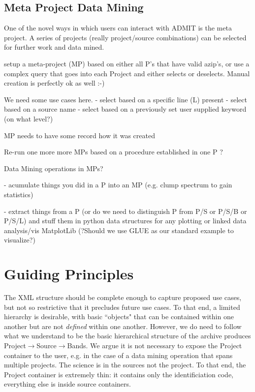 \documentclass{report}
\begin{document}
\subsection{Meta Project Data Mining}

One of the novel ways in which users can interact with ADMIT is the meta project.
A series of projects (really project/source combinations)
can be selected for further work and data mined.



setup a meta-project (MP) based on either all P's that have valid azip's, or use 
a complex query that goes into each Project and either selects or deselects.
Manual creation is perfectly ok as well :-)

We need some use cases here. 
    - select based on a specific line (L) present
    - select based on a source name
    - select based on a previously set user supplied keyword (on what level?)

MP needs to have some record how it was created
  
Re-run one more more MPs based on a procedure established in one P ?

Data Mining operations in MPs?

- acumulate things you did in a P into an MP (e.g. clump spectrum to gain statistics)

- extract things from a P (or do we need to distinguish P from P/S or P/S/B or P/S/L)
and stuff them in python data structures for any plotting or linked data analysis/vis
MatplotLib (?Should we use GLUE as our standard example to visualize?)


\section{Guiding Principles}
The XML structure should be complete enough to capture proposed use cases,
but not so restrictive that it precludes future use cases. To that end, a
limited hierarchy is desirable, with basic ``objects" that can be contained
within one another but are not {\it defined} within one another.  However, we
do need to follow what we understand to be the basic hierarchical structure
of the archive produces Project$\rightarrow$Source$\rightarrow$Bands.
We argue it is not necessary to expose the Project container to
the user, e.g. in the case of a data mining operation that spans multiple
projects. The science is in the sources not the project. To that end, the
Project container is extremely thin: it contains only the identificiation
code, everything else is inside source containers.
\end{document}

